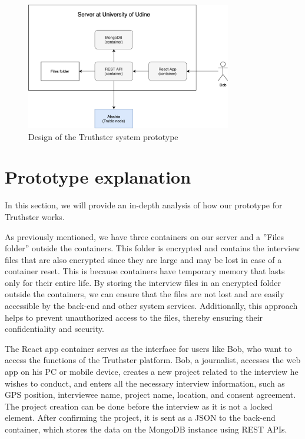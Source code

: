 \documentclass[target=mst,aauheader=]{thud}
\begin{document}
\begin{figure}
    \centering
    \includegraphics[width=0.8\textwidth]{images/prototypeSchema.png}
    \caption{Design of the Truthster system prototype}
    \label{fig:prototypeSchema}
\end{figure}

\section{Prototype explanation}

In this section, we will provide an in-depth analysis of how our prototype for Truthster works.

As previously mentioned, we have three containers on our server and a ”Files folder” outside the containers. This folder is encrypted and contains the interview files that are also encrypted since they are large and may be lost in case of a container reset. This is because containers have temporary memory that lasts only for their entire life. By storing the interview files in an encrypted folder outside the containers, we can ensure that the files are not lost and are easily accessible by the back-end and other system services. Additionally, this approach helps to prevent unauthorized access to the files, thereby ensuring their confidentiality and security.

The React app container serves as the interface for users like Bob, who want to access the functions of the Truthster platform. Bob, a journalist, accesses the web app on his PC or mobile device, creates a new project related to the interview he wishes to conduct, and enters all the necessary interview information, such as GPS position, interviewee name, project name, location, and consent agreement. The project creation can be done before the interview as it is not a locked element. After confirming the project, it is sent as a JSON to the back-end container, which stores the data on the MongoDB instance using REST APIs.
\end{document}
